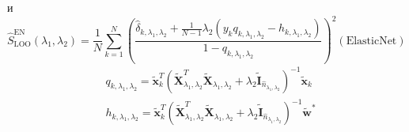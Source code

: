 \documentclass[12pt, twoside]{article}
\newcommand{\wm}{{\mathbf{w}}}
\begin{document}
и
\begin{equation}
\hat{S}_{\mathrm{LOO}}^{\mathrm{EN}}\left(\lambda_{1}, \lambda_{2}\right)=\frac{1}{N} \sum_{k=1}^{N}\left(\frac{\hat{\delta}_{k, \lambda_{1}, \lambda_{2}}+\frac{1}{N-1} \lambda_{2}\left(y_{k} q_{k, \lambda_{1}, \lambda_{2}}-h_{k, \lambda_{1}, \lambda_{2}}\right)}{1-q_{k, \lambda_{1}, \lambda_{2}}}\right)^{2}(\text {ElasticNet})
\end{equation}
\begin{equation}
\begin{aligned}
&q_{k, \lambda_{1}, \lambda_{2}}=\tilde{\mathbf{x}}_{k}^{T}\left(\tilde{\mathbf{X}}_{\lambda_{1}, \lambda_{2}}^{T} \tilde{\mathbf{X}}_{\lambda_{1}, \lambda_{2}}+\lambda_{2} \tilde{\mathbf{I}}_{\hat{n}_{\lambda_{1}, \lambda_{2}}}\right)^{-1} \tilde{\mathbf{x}}_{k}\\
&h_{k, \lambda_{1}, \lambda_{2}}=\tilde{\mathbf{x}}_{k}^{T}\left(\tilde{\mathbf{X}}_{\lambda_{1}, \lambda_{2}}^{T} \tilde{\mathbf{X}}_{\lambda_{1}, \lambda_{2}}+\lambda_{2} \tilde{\mathbf{I}}_{\hat{n}_{\lambda_{1}, \lambda_{2}}}\right)^{-1} \tilde{\wm}^{*}
\end{aligned}
\end{equation}






\end{document}
